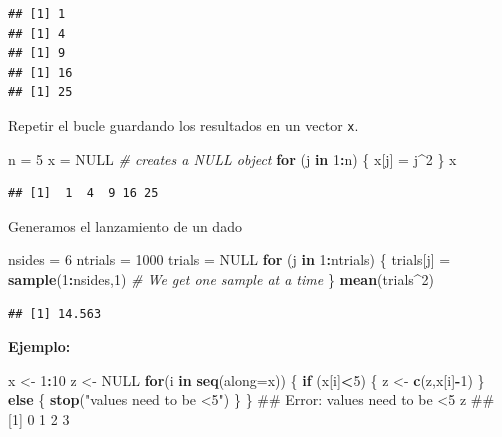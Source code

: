 \documentclass[]{book}
\newenvironment{Shaded}{\begin{snugshade}}{\end{snugshade}}
\newcommand{\KeywordTok}[1]{\textcolor[rgb]{0.13,0.29,0.53}{\textbf{#1}}}
\newcommand{\DataTypeTok}[1]{\textcolor[rgb]{0.13,0.29,0.53}{#1}}
\newcommand{\DecValTok}[1]{\textcolor[rgb]{0.00,0.00,0.81}{#1}}
\newcommand{\StringTok}[1]{\textcolor[rgb]{0.31,0.60,0.02}{#1}}
\newcommand{\CommentTok}[1]{\textcolor[rgb]{0.56,0.35,0.01}{\textit{#1}}}
\newcommand{\OtherTok}[1]{\textcolor[rgb]{0.56,0.35,0.01}{#1}}
\newcommand{\ControlFlowTok}[1]{\textcolor[rgb]{0.13,0.29,0.53}{\textbf{#1}}}
\newcommand{\OperatorTok}[1]{\textcolor[rgb]{0.81,0.36,0.00}{\textbf{#1}}}
\newcommand{\NormalTok}[1]{#1}
\begin{document}
\begin{verbatim}
## [1] 1
## [1] 4
## [1] 9
## [1] 16
## [1] 25
\end{verbatim}

Repetir el bucle guardando los resultados en un vector \texttt{x}.

\begin{Shaded}
\begin{Highlighting}[]
\NormalTok{n =}\StringTok{ }\DecValTok{5}
\NormalTok{x =}\StringTok{ }\OtherTok{NULL}  \CommentTok{# creates a NULL object}
\ControlFlowTok{for}\NormalTok{ (j }\ControlFlowTok{in} \DecValTok{1}\OperatorTok{:}\NormalTok{n)}
\NormalTok{\{}
\NormalTok{  x[j] =}\StringTok{ }\NormalTok{j}\OperatorTok{^}\DecValTok{2}
\NormalTok{\}}
\NormalTok{x}
\end{Highlighting}
\end{Shaded}

\begin{verbatim}
## [1]  1  4  9 16 25
\end{verbatim}

Generamos el lanzamiento de un dado

\begin{Shaded}
\begin{Highlighting}[]
\NormalTok{nsides =}\StringTok{ }\DecValTok{6}
\NormalTok{ntrials =}\StringTok{ }\DecValTok{1000}
\NormalTok{trials =}\StringTok{ }\OtherTok{NULL}
\ControlFlowTok{for}\NormalTok{ (j }\ControlFlowTok{in} \DecValTok{1}\OperatorTok{:}\NormalTok{ntrials)}
\NormalTok{\{}
\NormalTok{  trials[j] =}\StringTok{ }\KeywordTok{sample}\NormalTok{(}\DecValTok{1}\OperatorTok{:}\NormalTok{nsides,}\DecValTok{1}\NormalTok{)  }\CommentTok{# We get one sample at a time}
\NormalTok{\}}
\KeywordTok{mean}\NormalTok{(trials}\OperatorTok{^}\DecValTok{2}\NormalTok{)}
\end{Highlighting}
\end{Shaded}

\begin{verbatim}
## [1] 14.563
\end{verbatim}

\textbf{Ejemplo:}

\begin{Shaded}
\begin{Highlighting}[]
\NormalTok{x <-}\StringTok{ }\DecValTok{1}\OperatorTok{:}\DecValTok{10}
\NormalTok{z <-}\StringTok{ }\OtherTok{NULL}
\ControlFlowTok{for}\NormalTok{(i }\ControlFlowTok{in} \KeywordTok{seq}\NormalTok{(}\DataTypeTok{along=}\NormalTok{x)) \{}
    \ControlFlowTok{if}\NormalTok{ (x[i]}\OperatorTok{<}\DecValTok{5}\NormalTok{) \{}
\NormalTok{        z <-}\StringTok{ }\KeywordTok{c}\NormalTok{(z,x[i]}\OperatorTok{-}\DecValTok{1}\NormalTok{) }
\NormalTok{    \} }\ControlFlowTok{else}\NormalTok{ \{}
        \KeywordTok{stop}\NormalTok{(}\StringTok{"values need to be <5"}\NormalTok{)}
\NormalTok{    \}}
\NormalTok{\}}
\NormalTok{## Error: values need to be <5}
\NormalTok{z}
\NormalTok{## [1] 0 1 2 3}
\end{Highlighting}
\end{Shaded}
\end{document}
